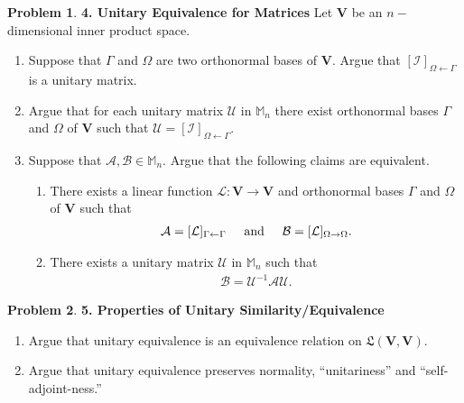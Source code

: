 \documentclass{article}
\theoremstyle{definition}
\newtheorem*{prob*}{Problem}
\newcommand{\V}{\mathbf{V}}
\newcommand{\A}{\mathcal{A}}
\newcommand{\B}{\mathcal{B}}
\newcommand{\lag}{\mathcal{L}}
\newcommand{\LL}{\mathfrak{L}}
\begin{document}
\begin{prob*}\textbf{4. Unitary Equivalence for Matrices}
	Let $\V$ be an $n-$dimensional inner product space. 
	\begin{enumerate}
		\item Suppose that $\Gamma$ and $\Omega$ are two orthonormal bases of $\V$. Argue that $[\mathcal{I}]_{\Omega\leftarrow\Gamma}$ is a unitary matrix. 
		
		\item Argue that for each unitary matrix $\mathcal{U}$ in $\mathbb{M}_n$ there exist orthonormal bases $\Gamma$ and $\Omega$ of $\V$ such that $\mathcal{U} = [\mathcal{I}]_{\Omega\leftarrow\Gamma}$. 
		
		
		\item Suppose that $\A,\B \in \mathbb{M}_n$. Argue that the following claims are equivalent. 
		\begin{enumerate}
			\item There exists a linear function $\lag: \V \to \V$ and orthonormal bases $\Gamma$ and $\Omega$ of $\V$ such that 
			\begin{align*}
			\A = [\lag]_{\Gamma\leftarrow\Gamma} \hspace{0.5cm} \text{and} \hspace{0.5cm} \B = [\lag]_{\Omega\to \Omega}.
			\end{align*}
			
			\item There exists a unitary matrix $\mathcal{U}$ in $\mathbb{M}_n$ such that 
			\begin{align*}
			\B = \mathcal{U}^{-1}\A \mathcal{U}. 
			\end{align*}
		\end{enumerate}
	\end{enumerate}
\end{prob*}





\newpage






\begin{prob*}\textbf{5. Properties of Unitary Similarity/Equivalence}
	\begin{enumerate}
		\item Argue that unitary equivalence is an equivalence relation on $\LL(\V,\V)$. 
		\item Argue that unitary equivalence preserves normality, ``unitariness'' and ``self-adjoint-ness.''
	\end{enumerate}
	
\end{prob*}
\end{document}
